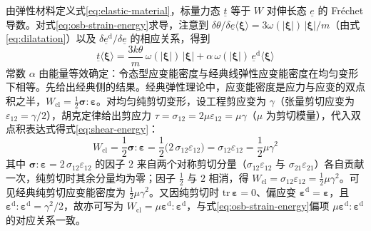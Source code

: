 由弹性材料定义式\eqref{eq:elastic-material}，标量力态 $\underline{t}$ 等于 $W$ 对伸长态 $\underline{e}$ 的 Fréchet 导数。对式\eqref{eq:osb-strain-energy}求导，注意到 $\delta\theta/\delta\underline{e}\langle\boldsymbol{\xi}\rangle=3\omega(|\boldsymbol{\xi}|)\,|\boldsymbol{\xi}|/m$（由式\eqref{eq:dilatation}）以及 $\delta\underline{e}^{\mathrm{d}}/\delta\underline{e}$ 的相应关系，得到
\begin{equation}
  \underline{t}\langle\boldsymbol{\xi}\rangle=\frac{3k\theta}{m}\,\omega(|\boldsymbol{\xi}|)\,|\boldsymbol{\xi}|+\alpha\,\omega(|\boldsymbol{\xi}|)\,\underline{e}^{\mathrm{d}}\langle\boldsymbol{\xi}\rangle
  \label{eq:osb-t-general}
\end{equation}
常数 $\alpha$ 由能量等效确定：令态型应变能密度与经典线弹性应变能密度在均匀变形下相等。先给出经典侧的结果。经典弹性理论中，应变能密度是应力与应变的双点积之半，$W_{\mathrm{cl}}=\tfrac{1}{2}\boldsymbol{\sigma}:\boldsymbol{\varepsilon}$。对均匀纯剪切变形，设工程剪应变为 $\gamma$（张量剪切应变为 $\varepsilon_{12}=\gamma/2$），胡克定律给出剪应力 $\tau=\sigma_{12}=2\mu\varepsilon_{12}=\mu\gamma$（$\mu$ 为剪切模量），代入双点积表达式得式\eqref{eq:shear-energy}：
\begin{equation}
  W_{\mathrm{cl}}=\frac{1}{2}\boldsymbol{\sigma}:\boldsymbol{\varepsilon}
  =\frac{1}{2}\bigl(2\,\sigma_{12}\varepsilon_{12}\bigr)
  =\sigma_{12}\varepsilon_{12}
  =\frac{1}{2}\mu\gamma^{2}
  \label{eq:shear-energy}
\end{equation}
其中 $\boldsymbol{\sigma}:\boldsymbol{\varepsilon}=2\,\sigma_{12}\varepsilon_{12}$ 的因子 $2$ 来自两个对称剪切分量（$\sigma_{12}\varepsilon_{12}$ 与 $\sigma_{21}\varepsilon_{21}$）各自贡献一次，纯剪切时其余分量均为零；因子 $\tfrac{1}{2}$ 与 $2$ 相消，得 $W_{\mathrm{cl}}=\sigma_{12}\varepsilon_{12}=\tfrac{1}{2}\mu\gamma^{2}$。可见经典纯剪切应变能密度为 $\tfrac{1}{2}\mu\gamma^{2}$。又因纯剪切时 $\mathrm{tr}\,\boldsymbol{\varepsilon}=0$、偏应变 $\boldsymbol{\varepsilon}^{\mathrm{d}}=\boldsymbol{\varepsilon}$，且 $\boldsymbol{\varepsilon}^{\mathrm{d}}:\boldsymbol{\varepsilon}^{\mathrm{d}}=\gamma^{2}/2$，故亦可写为 $W_{\mathrm{cl}}=\mu\boldsymbol{\varepsilon}^{\mathrm{d}}:\boldsymbol{\varepsilon}^{\mathrm{d}}$，与式\eqref{eq:osb-strain-energy}偏项 $\mu\boldsymbol{\varepsilon}^{\mathrm{d}}:\boldsymbol{\varepsilon}^{\mathrm{d}}$ 的对应关系一致。

